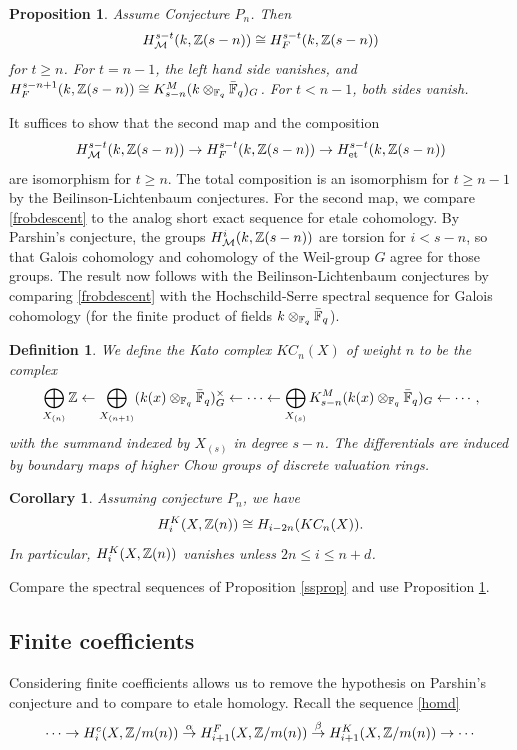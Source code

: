 \documentclass[nospthms,envcountsect]{svmult} %
\newtheorem{corollary}  [theorem]       {Corollary}
\newtheorem{proposition}[theorem]       {Proposition}
\newtheorem{definition} [theorem]       {Definition}
\begin{document}
\begin{proposition}\label{pupl}
Assume Conjecture $P_n$. Then
$$H^{s-t}_{\mathcal M}(k,{{\mathbb Z}}(s-n))\cong  H^{s-t}_F(k,{{\mathbb Z}}(s-n))$$
for $t\geq n$. For $t=n-1$, the left hand side vanishes, and 
$H^{s-n+1}_F(k,{{\mathbb Z}}(s-n))\cong K_{s-n}^M(k\otimes_{{{\mathbb F}}_q}\bar {{{\mathbb F}}}_q)_G$.
For $t<n-1$, both sides vanish.
\end{proposition}


\proof
It suffices to show that the second map and the composition
$$H^{s-t}_{\mathcal M}(k,{{\mathbb Z}}(s-n))\to H^{s-t}_F(k,{{\mathbb Z}}(s-n))
\to H^{s-t}_{\text{\rm et}}(k,{{\mathbb Z}}(s-n))$$
are isomorphism for $t\geq n$. 
The total composition is an isomorphism for $t\geq n-1$
by the Beilinson-Lichtenbaum conjectures. 
For the second map, we compare \eqref{frobdescent} to the
analog short exact sequence for etale cohomology. 
By Parshin's conjecture,
the groups $H^i_{\mathcal M}(k,{{\mathbb Z}}(s-n))$ are torsion for $i<s-n$,
so that Galois cohomology and cohomology of the Weil-group $G$
agree for those groups. The result now follows with
the Beilinson-Lichtenbaum conjectures by comparing \eqref{frobdescent}
with the Hochschild-Serre spectral sequence for Galois cohomology
(for the finite product of fields $k\otimes_{{{\mathbb F}}_q}\bar{{{\mathbb F}}}_q$).
\proofend


\begin{definition}
We define the Kato complex $KC_n(X)$ of weight $n$ to be the complex 
$$ \bigoplus_{X_{(n)}} {{\mathbb Z}} \gets 
\bigoplus_{X_{(n+1)}} (k(x)\otimes_{{{\mathbb F}}_q}\bar{{{\mathbb F}}}_q)^\times_G \gets
\cdots\gets 
\bigoplus_{X_{(s)}} K_{s-n}^M(k(x)\otimes_{{{\mathbb F}}_q}\bar{{{\mathbb F}}}_q)_G
\gets\cdots,$$
with the summand indexed by $X_{(s)}$ in degree $s-n$. The differentials
are induced by boundary maps of higher Chow groups of discrete
valuation rings.
\end{definition}


\begin{corollary}
Assuming conjecture $P_n$, we have 
$$H_i^K(X,{{\mathbb Z}}(n))\cong H_{i-2n}(KC_n(X)).$$
In particular, $H_i^K(X,{{\mathbb Z}}(n))$ vanishes unless $2n\leq i\leq n+d$.
\end{corollary}

\proof Compare the spectral sequences of Proposition \ref{ssprop}
and use Proposition \ref{pupl}.
\proofend




\subsection{Finite coefficients}
Considering finite coefficients allows us to remove
the hypothesis on Parshin's conjecture and to compare to 
etale homology.  Recall the sequence \eqref{homd}
\begin{equation}
\label{hommodm}
\cdots\to H_i^c(X,{{\mathbb Z}}/m(n)) \stackrel{\alpha}{\to} H_{i+1}^F(X,{{\mathbb Z}}/m(n)) 
\stackrel{\beta}{\to}  H_{i+1}^K(X,{{\mathbb Z}}/m(n))\to \cdots 
\end{equation}
\end{document}
